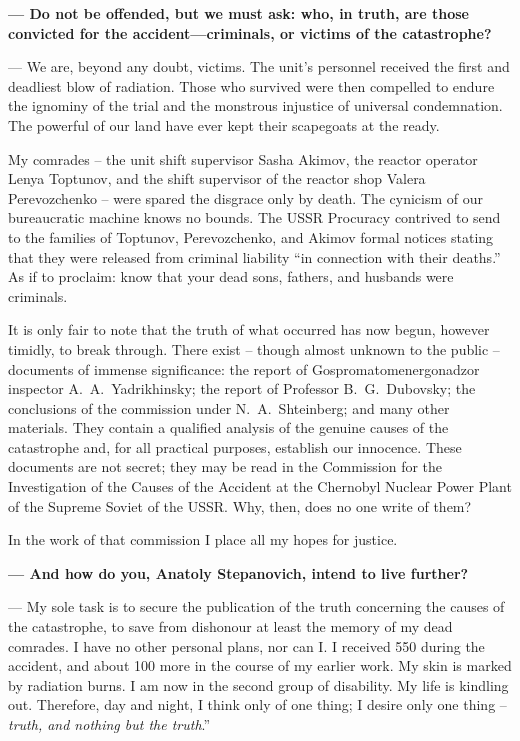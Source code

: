 \documentclass[openright]{bookest}
\begin{document}
\medskip

\textbf{--- Do not be offended, but we must ask: who, in truth, are those convicted for the accident---criminals, or victims of the catastrophe?}

\noindent
--- We are, beyond any doubt, victims. The unit's personnel received the first and deadliest blow of radiation. Those who survived were then compelled to endure the ignominy of the trial and the monstrous injustice of universal condemnation. The powerful of our land have ever kept their scapegoats at the ready.

My comrades -- the unit shift supervisor Sasha Akimov, the reactor operator Lenya Toptunov, and the shift supervisor of the reactor shop Valera Perevozchenko -- were spared the disgrace only by death. The cynicism of our bureaucratic machine knows no bounds. The USSR Procuracy contrived to send to the families of Toptunov, Perevozchenko, and Akimov formal notices stating that they were released from criminal liability ``in connection with their deaths.'' As if to proclaim: know that your dead sons, fathers, and husbands were criminals.

It is only fair to note that the truth of what occurred has now begun, however timidly, to break through. There exist -- though almost unknown to the public -- documents of immense significance: the report of Gospromatomenergonadzor inspector A.~A.~Yadrikhinsky; the report of Professor B.~G.~Dubovsky; the conclusions of the commission under N.~A.~Shteinberg; and many other materials. They contain a qualified analysis of the genuine causes of the catastrophe and, for all practical purposes, establish our innocence. These documents are not secret; they may be read in the Commission for the Investigation of the Causes of the Accident at the Chernobyl Nuclear Power Plant of the Supreme Soviet of the USSR. Why, then, does no one write of them? 

In the work of that commission I place all my hopes for justice.

\medskip

\textbf{--- And how do you, Anatoly Stepanovich, intend to live further?}

\noindent
--- My sole task is to secure the publication of the truth concerning the causes of the catastrophe, to save from dishonour at least the memory of my dead comrades. I have no other personal plans, nor can I. I received \qty{550}{\rem} during the accident, and about \qty{100}{\rem} more in the course of my earlier work. My skin is marked by radiation burns. I am now in the second group of disability. My life is kindling out. Therefore, day and night, I think only of one thing; I desire only one thing -- \textit{truth, and nothing but the truth}.''
\end{document}
